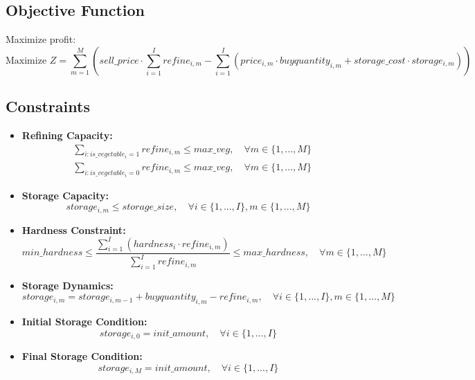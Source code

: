 \documentclass{article}
\begin{document}
\subsection*{Objective Function}
Maximize profit:
\[
\text{Maximize } Z = \sum_{m=1}^{M} \left( sell\_price \cdot \sum_{i=1}^{I} refine_{i,m} - \sum_{i=1}^{I} (price_{i,m} \cdot buyquantity_{i,m} + storage\_cost \cdot storage_{i,m}) \right)
\]

\subsection*{Constraints}

\begin{itemize}
    \item \textbf{Refining Capacity:}
    \begin{align*}
    & \sum_{i: is\_vegetable_i=1} refine_{i,m} \leq max\_veg, \quad \forall m \in \{1,...,M\} \\
    & \sum_{i: is\_vegetable_i=0} refine_{i,m} \leq max\_veg, \quad \forall m \in \{1,...,M\}
    \end{align*}
    
    \item \textbf{Storage Capacity:}
    \[
    storage_{i,m} \leq storage\_size, \quad \forall i \in \{1,...,I\}, m \in \{1,...,M\}
    \]

    \item \textbf{Hardness Constraint:}
    \[
    min\_hardness \leq \frac{\sum_{i=1}^{I} (hardness_i \cdot refine_{i,m})}{\sum_{i=1}^{I} refine_{i,m}} \leq max\_hardness, \quad \forall m \in \{1,...,M\}
    \]

    \item \textbf{Storage Dynamics:}
    \[
    storage_{i,m} = storage_{i,m-1} + buyquantity_{i,m} - refine_{i,m}, \quad \forall i \in \{1,...,I\}, m \in \{1,...,M\}
    \]

    \item \textbf{Initial Storage Condition:}
    \[
    storage_{i,0} = init\_amount, \quad \forall i \in \{1,...,I\}
    \]

    \item \textbf{Final Storage Condition:}
    \[
    storage_{i,M} = init\_amount, \quad \forall i \in \{1,...,I\}
    \]
\end{itemize}
\end{document}
